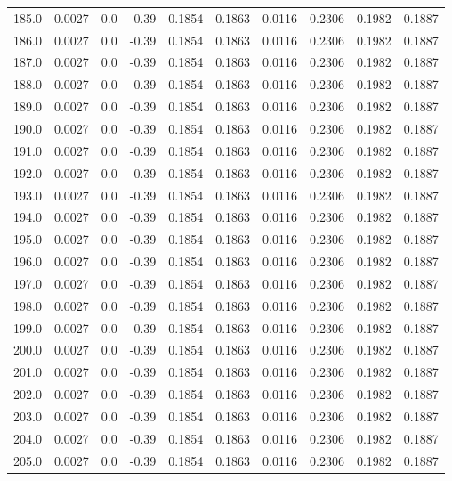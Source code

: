 \begin{longtable}{lrrrrrrrrr}
185.0 & 0.0027 & 0.0 & -0.39 & 0.1854 & 0.1863 & 0.0116 & 0.2306 & 0.1982 & 0.1887 \\
186.0 & 0.0027 & 0.0 & -0.39 & 0.1854 & 0.1863 & 0.0116 & 0.2306 & 0.1982 & 0.1887 \\
187.0 & 0.0027 & 0.0 & -0.39 & 0.1854 & 0.1863 & 0.0116 & 0.2306 & 0.1982 & 0.1887 \\
188.0 & 0.0027 & 0.0 & -0.39 & 0.1854 & 0.1863 & 0.0116 & 0.2306 & 0.1982 & 0.1887 \\
189.0 & 0.0027 & 0.0 & -0.39 & 0.1854 & 0.1863 & 0.0116 & 0.2306 & 0.1982 & 0.1887 \\
190.0 & 0.0027 & 0.0 & -0.39 & 0.1854 & 0.1863 & 0.0116 & 0.2306 & 0.1982 & 0.1887 \\
191.0 & 0.0027 & 0.0 & -0.39 & 0.1854 & 0.1863 & 0.0116 & 0.2306 & 0.1982 & 0.1887 \\
192.0 & 0.0027 & 0.0 & -0.39 & 0.1854 & 0.1863 & 0.0116 & 0.2306 & 0.1982 & 0.1887 \\
193.0 & 0.0027 & 0.0 & -0.39 & 0.1854 & 0.1863 & 0.0116 & 0.2306 & 0.1982 & 0.1887 \\
194.0 & 0.0027 & 0.0 & -0.39 & 0.1854 & 0.1863 & 0.0116 & 0.2306 & 0.1982 & 0.1887 \\
195.0 & 0.0027 & 0.0 & -0.39 & 0.1854 & 0.1863 & 0.0116 & 0.2306 & 0.1982 & 0.1887 \\
196.0 & 0.0027 & 0.0 & -0.39 & 0.1854 & 0.1863 & 0.0116 & 0.2306 & 0.1982 & 0.1887 \\
197.0 & 0.0027 & 0.0 & -0.39 & 0.1854 & 0.1863 & 0.0116 & 0.2306 & 0.1982 & 0.1887 \\
198.0 & 0.0027 & 0.0 & -0.39 & 0.1854 & 0.1863 & 0.0116 & 0.2306 & 0.1982 & 0.1887 \\
199.0 & 0.0027 & 0.0 & -0.39 & 0.1854 & 0.1863 & 0.0116 & 0.2306 & 0.1982 & 0.1887 \\
200.0 & 0.0027 & 0.0 & -0.39 & 0.1854 & 0.1863 & 0.0116 & 0.2306 & 0.1982 & 0.1887 \\
201.0 & 0.0027 & 0.0 & -0.39 & 0.1854 & 0.1863 & 0.0116 & 0.2306 & 0.1982 & 0.1887 \\
202.0 & 0.0027 & 0.0 & -0.39 & 0.1854 & 0.1863 & 0.0116 & 0.2306 & 0.1982 & 0.1887 \\
203.0 & 0.0027 & 0.0 & -0.39 & 0.1854 & 0.1863 & 0.0116 & 0.2306 & 0.1982 & 0.1887 \\
204.0 & 0.0027 & 0.0 & -0.39 & 0.1854 & 0.1863 & 0.0116 & 0.2306 & 0.1982 & 0.1887 \\
205.0 & 0.0027 & 0.0 & -0.39 & 0.1854 & 0.1863 & 0.0116 & 0.2306 & 0.1982 & 0.1887 \\

\end{longtable}
